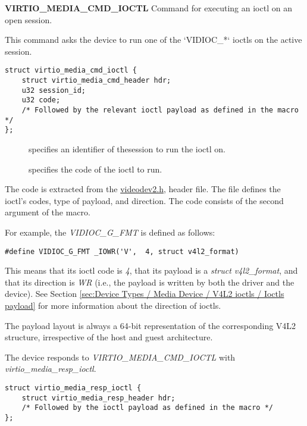 \textbf{VIRTIO_MEDIA_CMD_IOCTL} Command for executing an ioctl on an open
session.

This command asks the device to run one of the `VIDIOC_*` ioctls on the active
session.

\begin{lstlisting}
struct virtio_media_cmd_ioctl {
    struct virtio_media_cmd_header hdr;
    u32 session_id;
    u32 code;
    /* Followed by the relevant ioctl payload as defined in the macro */
};
\end{lstlisting}

\begin{description}
\item[] specifies an identifier of thesession to run the ioctl on.
\item[] specifies the code of the  ioctl to run.
\end{description}

The code is extracted from the
\href{https://www.kernel.org/doc/html/latest/userspace-api/media/v4l/videodev.html}{videodev2.h},
header file. The file defines the ioctl's codes, type of payload, and
direction. The code consists of the second argument of the  macro.

For example, the \textit{VIDIOC_G_FMT} is defined as follows:

\begin{lstlisting}
#define VIDIOC_G_FMT _IOWR('V',  4, struct v4l2_format)
\end{lstlisting}

This means that its ioctl code is \textit{4}, that its payload is a
\textit{struct v4l2_format}, and that its direction is \textit{WR} (i.e., the
payload is written by both the driver and the device).
See Section \ref{sec:Device Types / Media Device / V4L2 ioctls / Ioctls payload}
for more information about the direction of ioctls.

The payload layout is always a 64-bit representation of the corresponding
V4L2 structure, irrespective of the host and guest architecture.

The device responds to \textit{VIRTIO_MEDIA_CMD_IOCTL} with \textit{virtio_media_resp_ioctl}.

\begin{lstlisting}
struct virtio_media_resp_ioctl {
    struct virtio_media_resp_header hdr;
    /* Followed by the ioctl payload as defined in the macro */
};
\end{lstlisting}

